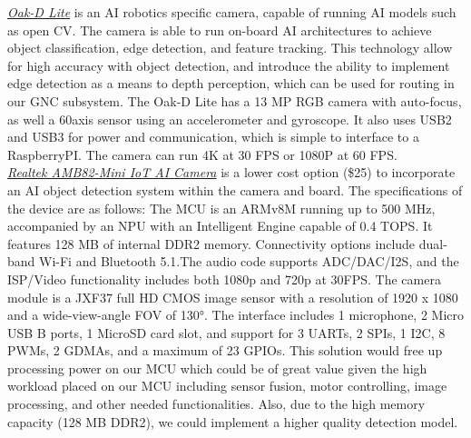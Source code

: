 \noindent \underline{\textit{Oak-D Lite}} is an AI robotics specific camera, capable of running AI models such as open CV. The camera is able to run on-board AI architectures to achieve object classification, edge detection, and feature tracking. This technology allow for high accuracy with object detection, and introduce the ability to implement edge detection as a means to depth perception, which can be used for routing in our GNC subsystem. The Oak-D Lite has a 13 MP RGB camera with auto-focus, as well a 60axis sensor using an accelerometer and gyroscope. It also uses USB2 and USB3 for power and communication, which is simple to interface to a RaspberryPI. The camera can run 4K at 30 FPS or 1080P at 60 FPS.\\

\noindent \underline{\textit{Realtek AMB82-Mini IoT AI Camera}} is a lower cost option (\$25) to incorporate an AI object detection system within the camera and board. The specifications of the device are as follows: The MCU is an ARMv8M running up to 500 MHz, accompanied by an NPU with an Intelligent Engine capable of 0.4 TOPS. It features 128 MB of internal DDR2 memory. Connectivity options include dual-band Wi-Fi and Bluetooth 5.1.The audio code supports ADC/DAC/I2S, and the ISP/Video functionality includes both 1080p and 720p at 30FPS. The camera module is a JXF37 full HD CMOS image sensor with a resolution of 1920 x 1080 and a wide-view-angle FOV of 130°. The interface includes 1 microphone, 2 Micro USB B ports, 1 MicroSD card slot, and support for 3 UARTs, 2 SPIs, 1 I2C, 8 PWMs, 2 GDMAs, and a maximum of 23 GPIOs. This solution would free up processing power on our MCU which could be of great value given the high workload placed on our MCU including sensor fusion, motor controlling, image processing, and other needed functionalities. Also, due to the high memory capacity (128 MB DDR2), we could implement a higher quality detection model.\\

